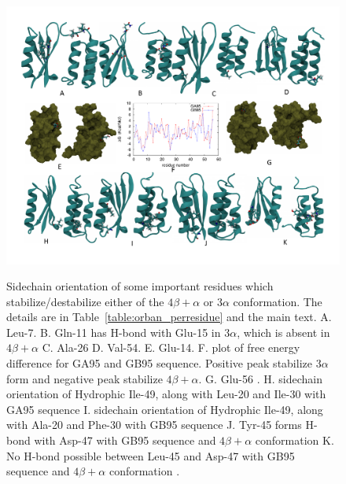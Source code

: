\documentclass[12pt]{article}
\begin{document}
\begin{figure}
\includegraphics[width=6.4 in,height=5.3 in]{orban_full.pdf}
\label{fig:orban_full}
\caption{Sidechain orientation of some important residues which stabilize/destabilize either of the $4 \beta + \alpha$ or $3 \alpha$ conformation.
The details are in Table~\ref{table:orban_perresidue} and the main text.  
A. Leu-7.
B. Gln-11 has H-bond with Glu-15 in $3 \alpha$, which is absent in $4 \beta + \alpha$
C. Ala-26
D. Val-54.
E. Glu-14.
F. plot of free energy difference for GA95 and GB95 sequence. Positive peak stabilize $3 \alpha$ form and negative peak 
stabilize $4 \beta + \alpha$. 
G. Glu-56 .
H. sidechain orientation of Hydrophic Ile-49, along with Leu-20 and Ile-30 with GA95 sequence
I. sidechain orientation of Hydrophic Ile-49, along with Ala-20 and Phe-30 with GB95 sequence
J. Tyr-45 forms H-bond with Asp-47 with GB95 sequence and $4 \beta + \alpha$ conformation
K. No H-bond possible between Leu-45 and Asp-47 with GB95 sequence and $4 \beta + \alpha$ conformation .}  
\end{figure}
\end{document}
